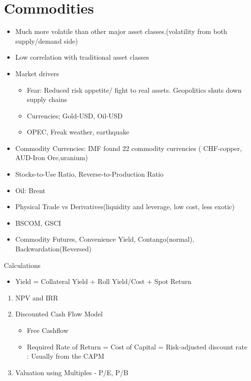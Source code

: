 \documentclass[11pt, openany]{book}              %
\begin{document}
\section{Commodities}

\begin{itemize}
    \item Much more volatile than other major asset classes.(volatility from both supply/demand side)
    \item Low correlation with traditional asset classes
    \item Market drivers
    \begin{itemize}
    	\item Fear: Reduced risk appetite/ fight to real assets. Geopolitics shuts down supply chains
    	\item Currencies; Gold-USD, Oil-USD
    	\item OPEC, Freak weather, earthquake
    \end{itemize}
    \item Commodity Currencies: IMF found 22 commodity currencies ( CHF-copper, AUD-Iron Ore,uranium)
    \item Stocks-to-Use Ratio, Reverse-to-Production Ratio
    \item Oil: Brent
    \item Physical Trade vs Derivatives(liquidity and leverage, low cost, less exotic)
    \item BSCOM, GSCI 
    \item Commodity Futures, Convenience Yield, Contango(normal), Backwardation(Reversed)
\end{itemize}

Calculations
\begin{itemize}
    \item Yield = Collateral Yield + Roll Yield/Cost + Spot Return
\end{itemize}

\begin{enumerate}
 \item NPV and IRR 
 \item Discounted Cash Flow Model
  \begin{itemize}
    \item Free Cashflow
    \item Required Rate of Return = Cost of Capital = Risk-adjusted discount rate : Usually from the CAPM
   \end{itemize}
 \item Valuation using Multiples - P/E, P/B 
 \end{enumerate}
\end{document}
